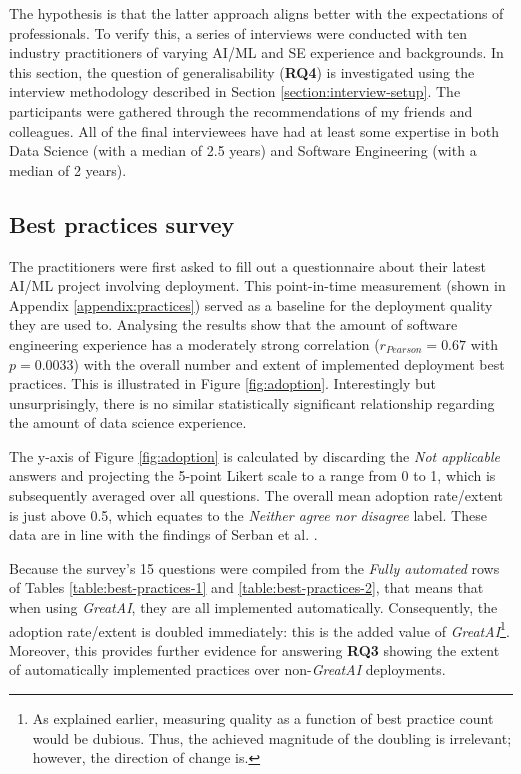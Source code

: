 The hypothesis is that the latter approach aligns better with the expectations of professionals. To verify this, a series of interviews were conducted with ten industry practitioners of varying AI/ML and SE experience and backgrounds. In this section, the question of generalisability (\textbf{RQ4}) is investigated using the interview methodology described in Section \ref{section:interview-setup}. The participants were gathered through the recommendations of my friends and colleagues. All of the final interviewees have had at least some expertise in both Data Science (with a median of 2.5 years) and Software Engineering (with a median of 2 years).

\subsection{Best practices survey} \label{subsection:best-practices-survey-results}

The practitioners were first asked to fill out a questionnaire about their latest AI/ML project involving deployment. This point-in-time measurement (shown in Appendix \ref{appendix:practices}) served as a baseline for the deployment quality they are used to. Analysing the results show that the amount of software engineering experience has a moderately strong correlation ($r_{Pearson} = 0.67$ with $p = 0.0033$) with the overall number and extent of implemented deployment best practices. This is illustrated in Figure \ref{fig:adoption}. Interestingly but unsurprisingly, there is no similar statistically significant relationship regarding the amount of data science experience. 

The y-axis of Figure \ref{fig:adoption} is calculated by discarding the \textit{Not applicable} answers and projecting the 5-point Likert scale to a range from 0 to 1, which is subsequently averaged over all questions. The overall mean adoption rate/extent is just above 0.5, which equates to the \textit{Neither agree nor disagree} label. These data are in line with the findings of Serban et al. \cite{serban2020adoption}.

Because the survey's 15 questions were compiled from the \textit{Fully automated} rows of Tables \ref{table:best-practices-1} and \ref{table:best-practices-2}, that means that when using \textit{GreatAI}, they are all implemented automatically. Consequently, the adoption rate/extent is doubled immediately: this is the added value of \textit{GreatAI}\footnote{As explained earlier, measuring quality as a function of best practice count would be dubious. Thus, the achieved magnitude of the doubling is irrelevant; however, the direction of change is.}. Moreover, this provides further evidence for answering \textbf{RQ3} showing the extent of automatically implemented practices over non-\textit{GreatAI} deployments.


